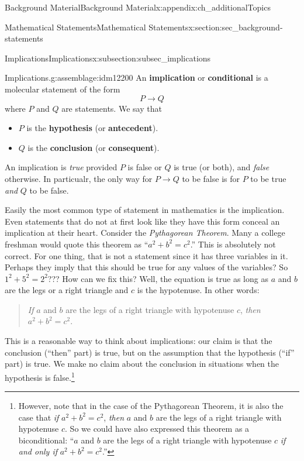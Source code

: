 \documentclass[oneside,10pt,]{book}
\newcommand{\terminology}[1]{\textbf{#1}}
\numberwithin{equation}{chapter}
\def\imp{\rightarrow}
\begin{document}
\begin{appendixptx}{Background Material}{}{Background Material}{}{}{x:appendix:ch_additionalTopics}
\begin{sectionptx}{Mathematical Statements}{}{Mathematical Statements}{}{}{x:section:sec_background-statements}
%
%
\typeout{************************************************}
\typeout{************************************************}
%
\begin{subsectionptx}{Implications}{}{Implications}{}{}{x:subsection:subsec_implications}
\begin{assemblage}{Implications.}{g:assemblage:idm12200}%
An \terminology{implication} or \terminology{conditional} is a molecular statement of the form%
\begin{equation*}
P \imp Q
\end{equation*}
where \(P\) and \(Q\) are statements.  We say that%
\begin{itemize}[label=\textbullet]
\item{}\(P\) is the \terminology{hypothesis} (or \terminology{antecedent}).%
\item{}\(Q\) is the \terminology{conclusion} (or \terminology{consequent}).%
\end{itemize}
%
\par
An implication is \emph{true} provided \(P\) is false or  \(Q\) is true (or both), and \emph{false} otherwise.  In particualr, the only way for \(P \imp Q\) to be false is for \(P\) to be true \emph{and} \(Q\) to be false.%
\end{assemblage}
Easily the most common type of statement in mathematics is the implication. Even statements that do not at first look like they have this form conceal an implication at their heart. Consider the \emph{Pythagorean Theorem}. Many a college freshman would quote this theorem as ``\(a^2 + b^2 = c^2\).'' This is absolutely not correct. For one thing, that is not a statement since it has three variables in it. Perhaps they imply that this should be true for any values of the variables?  So \(1^2 + 5^2 = 2^2\)??? How can we fix this? Well, the equation is true as long as \(a\) and \(b\) are the legs or a right triangle and \(c\) is the hypotenuse. In other words:%
\begin{quote}%
\emph{If} \(a\) and \(b\) are the legs of a right triangle with hypotenuse \(c\), \emph{then} \(a^2 + b^2 = c^2\).%
\end{quote}
This is a reasonable way to think about implications: our claim is that the conclusion (``then'' part) is true, but on the assumption that the hypothesis (``if'' part) is true. We make no claim about the conclusion in situations when the hypothesis is false.\footnote{However, note that in the case of the Pythagorean Theorem, it is also the case that \emph{if} \(a^2 + b^2 = c^2\), \emph{then} \(a\) and \(b\) are the legs of a right triangle with hypotenuse \(c\).  So we could have also expressed this theorem as a biconditional: ``\(a\) and \(b\) are the legs of a right triangle with hypotenuse \(c\) \emph{if and only if} \(a^2 + b^2 = c^2\).''\label{g:fn:idm12249}}%

\end{subsectionptx}
\end{sectionptx}
\end{appendixptx}
\end{document}
